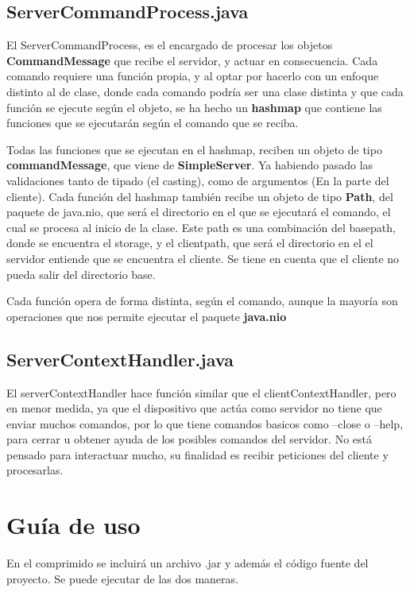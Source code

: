 \documentclass[a4paper, 12pt]{report}
\begin{document}
\section{ServerCommandProcess.java}

El ServerCommandProcess, es el encargado de procesar los objetos \textbf{CommandMessage} que recibe el
servidor, y actuar en consecuencia. Cada comando requiere una función propia, y al optar
por hacerlo con un enfoque distinto al de clase, donde cada comando podría ser una clase distinta y que cada
función se ejecute según el objeto, se ha hecho un \textbf{hashmap} que contiene las funciones que se ejecutarán
según el comando que se reciba.

Todas las funciones que se ejecutan en el hashmap, reciben un objeto de tipo \textbf{commandMessage},
que viene de \textbf{SimpleServer}. Ya habiendo pasado las validaciones tanto de tipado (el casting),
como de argumentos (En la parte del cliente). Cada función del hashmap también recibe un objeto de tipo
\textbf{Path}, del paquete de java.nio, que será el directorio en el que se ejecutará el comando, el cual se
procesa al inicio de la clase. Este path es una combinación del basepath, donde se encuentra el storage, y el
clientpath, que será el directorio en el el servidor entiende que se encuentra el cliente.
Se tiene en cuenta que el cliente no pueda salir del directorio base.

Cada función opera de forma distinta, según el comando, aunque la mayoría son operaciones que nos permite ejecutar el paquete \textbf{java.nio}

\section{ServerContextHandler.java}

El serverContextHandler hace función similar que el clientContextHandler, pero en menor medida, ya que el
dispositivo que actúa como servidor no tiene que enviar muchos comandos, por lo que tiene comandos basicos como
--close o --help, para cerrar u obtener ayuda de los posibles comandos del servidor. No está pensado para interactuar mucho, su finalidad es recibir peticiones del cliente y procesarlas.

\chapter{Guía de uso}
En el comprimido se incluirá un archivo .jar y además el código fuente del proyecto. Se puede ejecutar de las dos maneras.
\end{document}
